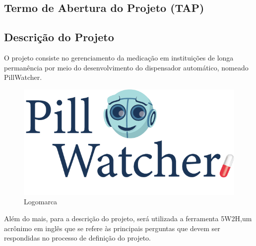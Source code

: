 \begin{apendicesenv}
\partapendices

\chapter{Termo de Abertura do Projeto (TAP)}
\label{ATP_app}
\section{Descrição do Projeto}

O projeto consiste no gerenciamento da medicação em instituições de longa permanência por meio do  desenvolvimento do dispensador automático, nomeado PillWatcher.


\begin{figure}[H]
    \centering
    \includegraphics[scale=2]{figuras/pillwatcher7.png}
    \caption{Logomarca}
    \label{fig:logo}
\end{figure}

Além do mais, para a descrição do projeto, será utilizada a ferramenta 5W2H,um acrônimo em inglês que se refere às principais perguntas que devem ser respondidas no processo de definição do projeto. 


\end{apendicesenv}
